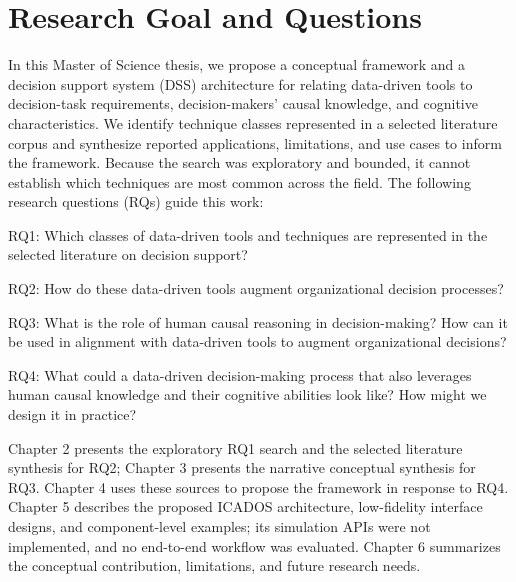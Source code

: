 \documentclass{sfuthesis}
\begin{document}
\section{Research Goal and Questions}
In this Master of Science thesis, we propose a conceptual framework and a decision support system (DSS) architecture for relating data-driven tools to decision-task requirements, decision-makers’ causal knowledge, and cognitive characteristics. We identify technique classes represented in a selected literature corpus and synthesize reported applications, limitations, and use cases to inform the framework. Because the search was exploratory and bounded, it cannot establish which techniques are most common across the field. The following research questions (RQs) guide this work:\par
RQ1: Which classes of data-driven tools and techniques are represented in the selected literature on decision support?\par
RQ2: How do these data-driven tools augment organizational decision processes? \par
RQ3: What is the role of human causal reasoning in decision-making? How can it be used in alignment with data-driven tools to augment organizational decisions?\par
RQ4: What could a data-driven decision-making process that also leverages human causal knowledge and their cognitive abilities look like? How might we design it in practice?\par
Chapter 2 presents the exploratory RQ1 search and the selected literature synthesis for RQ2; Chapter 3 presents the narrative conceptual synthesis for RQ3. Chapter 4 uses these sources to propose the framework in response to RQ4. Chapter 5 describes the proposed ICADOS architecture, low-fidelity interface designs, and component-level examples; its simulation APIs were not implemented, and no end-to-end workflow was evaluated. Chapter 6 summarizes the conceptual contribution, limitations, and future research needs.
\end{document}

